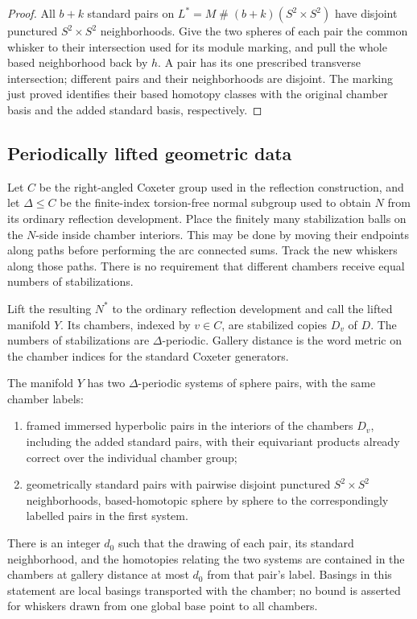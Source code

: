 \begin{proof}
All $b+k$ standard pairs on
$L^*=M\mathbin{\#}(b+k)(S^2\times S^2)$ have disjoint punctured
$S^2\times S^2$ neighborhoods.  Give the two spheres of each pair
the common whisker to their intersection used for its module marking,
and pull the whole based neighborhood back by $h$.  A pair has
its one prescribed transverse intersection; different pairs and their
neighborhoods are disjoint.  The marking just proved identifies their
based homotopy classes with the original chamber basis and the added
standard basis, respectively.
\end{proof}

\subsection{Periodically lifted geometric data}

Let $C$ be the right-angled Coxeter group used in the reflection
construction, and let $\Delta\le C$ be the finite-index torsion-free
normal subgroup used to obtain $N$ from its ordinary reflection
development.  Place the finitely many stabilization balls on the
$N$-side inside chamber interiors.  This may be done by moving their
endpoints along paths before performing the arc connected sums.
Track the new whiskers along those paths.  There is no requirement that
different chambers receive equal numbers of stabilizations.

Lift the resulting $N^*$ to the ordinary reflection development and
call the lifted manifold $Y$.  Its chambers, indexed by $v\in C$, are
stabilized copies $D_v$ of $D$.  The numbers of stabilizations are
$\Delta$-periodic.  Gallery distance is the word metric on the chamber
indices for the standard Coxeter generators.

\begin{proposition}\label{st:periodic-data}
The manifold $Y$ has two $\Delta$-periodic systems of sphere pairs,
with the same chamber labels:
\begin{enumerate}
\item framed immersed hyperbolic pairs in the interiors of the
chambers $D_v$, including the added standard pairs, with their
equivariant products already correct over the individual chamber group;
\item geometrically standard pairs with pairwise disjoint punctured
$S^2\times S^2$ neighborhoods, based-homotopic sphere by sphere to
the correspondingly labelled pairs in the first system.
\end{enumerate}
There is an integer $d_0$ such that the drawing of each pair, its
standard neighborhood, and the homotopies relating the two systems
are contained in the chambers at gallery distance at most $d_0$ from
that pair's label.  Basings in this statement are local basings
transported with the chamber; no bound is asserted for whiskers drawn
from one global base point to all chambers.
\end{proposition}

